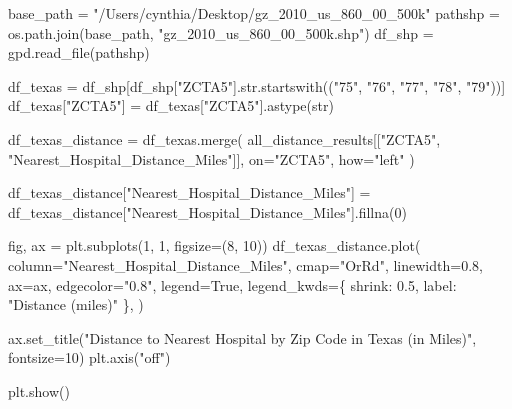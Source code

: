 \documentclass[
  letterpaper,
  DIV=11,
  numbers=noendperiod]{scrartcl}
\newenvironment{Shaded}{\begin{snugshade}}{\end{snugshade}}
\newcommand{\BuiltInTok}[1]{\textcolor[rgb]{0.00,0.23,0.31}{#1}}
\newcommand{\DecValTok}[1]{\textcolor[rgb]{0.68,0.00,0.00}{#1}}
\newcommand{\FloatTok}[1]{\textcolor[rgb]{0.68,0.00,0.00}{#1}}
\newcommand{\NormalTok}[1]{\textcolor[rgb]{0.00,0.23,0.31}{#1}}
\newcommand{\OperatorTok}[1]{\textcolor[rgb]{0.37,0.37,0.37}{#1}}
\newcommand{\StringTok}[1]{\textcolor[rgb]{0.13,0.47,0.30}{#1}}
\newcommand{\VariableTok}[1]{\textcolor[rgb]{0.07,0.07,0.07}{#1}}
\begin{document}
\begin{Shaded}
\begin{Highlighting}[]
\NormalTok{base\_path }\OperatorTok{=} \StringTok{"/Users/cynthia/Desktop/gz\_2010\_us\_860\_00\_500k"}
\NormalTok{pathshp }\OperatorTok{=}\NormalTok{ os.path.join(base\_path, }\StringTok{"gz\_2010\_us\_860\_00\_500k.shp"}\NormalTok{)}
\NormalTok{df\_shp }\OperatorTok{=}\NormalTok{ gpd.read\_file(pathshp)}

\NormalTok{df\_texas }\OperatorTok{=}\NormalTok{ df\_shp[df\_shp[}\StringTok{"ZCTA5"}\NormalTok{].}\BuiltInTok{str}\NormalTok{.startswith((}\StringTok{"75"}\NormalTok{, }\StringTok{"76"}\NormalTok{, }\StringTok{"77"}\NormalTok{, }\StringTok{"78"}\NormalTok{, }\StringTok{"79"}\NormalTok{))]}
\NormalTok{df\_texas[}\StringTok{"ZCTA5"}\NormalTok{] }\OperatorTok{=}\NormalTok{ df\_texas[}\StringTok{"ZCTA5"}\NormalTok{].astype(}\BuiltInTok{str}\NormalTok{)}

\NormalTok{df\_texas\_distance }\OperatorTok{=}\NormalTok{ df\_texas.merge(}
\NormalTok{    all\_distance\_results[[}\StringTok{"ZCTA5"}\NormalTok{, }\StringTok{"Nearest\_Hospital\_Distance\_Miles"}\NormalTok{]],}
\NormalTok{    on}\OperatorTok{=}\StringTok{"ZCTA5"}\NormalTok{,}
\NormalTok{    how}\OperatorTok{=}\StringTok{"left"}
\NormalTok{)}

\NormalTok{df\_texas\_distance[}\StringTok{"Nearest\_Hospital\_Distance\_Miles"}\NormalTok{] }\OperatorTok{=}\NormalTok{ df\_texas\_distance[}\StringTok{"Nearest\_Hospital\_Distance\_Miles"}\NormalTok{].fillna(}\DecValTok{0}\NormalTok{)}

\NormalTok{fig, ax }\OperatorTok{=}\NormalTok{ plt.subplots(}\DecValTok{1}\NormalTok{, }\DecValTok{1}\NormalTok{, figsize}\OperatorTok{=}\NormalTok{(}\DecValTok{8}\NormalTok{, }\DecValTok{10}\NormalTok{))}
\NormalTok{df\_texas\_distance.plot(}
\NormalTok{    column}\OperatorTok{=}\StringTok{"Nearest\_Hospital\_Distance\_Miles"}\NormalTok{,}
\NormalTok{    cmap}\OperatorTok{=}\StringTok{"OrRd"}\NormalTok{,}
\NormalTok{    linewidth}\OperatorTok{=}\FloatTok{0.8}\NormalTok{,}
\NormalTok{    ax}\OperatorTok{=}\NormalTok{ax,}
\NormalTok{    edgecolor}\OperatorTok{=}\StringTok{"0.8"}\NormalTok{,}
\NormalTok{    legend}\OperatorTok{=}\VariableTok{True}\NormalTok{,}
\NormalTok{    legend\_kwds}\OperatorTok{=}\NormalTok{\{}
        \StringTok{\textquotesingle{}shrink\textquotesingle{}}\NormalTok{: }\FloatTok{0.5}\NormalTok{,  }
        \StringTok{\textquotesingle{}label\textquotesingle{}}\NormalTok{: }\StringTok{"Distance (miles)"} 
\NormalTok{    \},}
\NormalTok{)}

\NormalTok{ax.set\_title(}\StringTok{"Distance to Nearest Hospital by Zip Code in Texas (in Miles)"}\NormalTok{, fontsize}\OperatorTok{=}\DecValTok{10}\NormalTok{)}
\NormalTok{plt.axis(}\StringTok{"off"}\NormalTok{)}

\NormalTok{plt.show()}
\end{Highlighting}
\end{Shaded}
\end{document}
